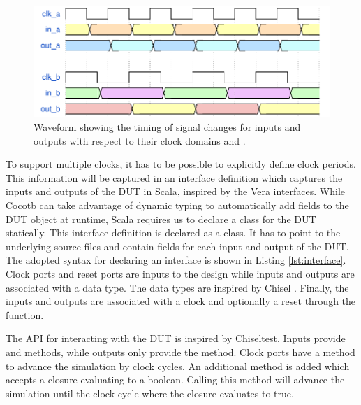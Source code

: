 \begin{figure}
\centering
\includegraphics[width=\textwidth]{diagrams/wavedrom.pdf}
\caption{Waveform showing the timing of signal changes for inputs and outputs with respect to their clock domains  and .}
\label{fig:wavedrom}
\end{figure}

To support multiple clocks, it has to be possible to explicitly define clock periods. This information will be captured in an interface definition which captures the inputs and outputs of the DUT in
Scala, inspired by the Vera interfaces. While Cocotb can take advantage of dynamic typing to automatically add fields to the DUT object at runtime,
Scala requires us to declare a class for the DUT statically. This interface definition is declared as a class.
It has to point to the underlying source files and contain fields for each input and output of the DUT. The adopted
syntax for declaring an interface is shown in Listing \ref{lst:interface}. Clock ports and reset ports are inputs to
the design while inputs and outputs are associated with a data type. The data types are inspired by Chisel
\cite{chiselpaper}. Finally, the inputs and outputs are associated with a clock and optionally a reset through the
 function.

The API for interacting with the DUT is inspired by Chiseltest. Inputs provide  and  methods,
while outputs only provide the  method. Clock ports have a  method to advance the simulation by
 clock cycles. An additional method  is added which accepts a closure evaluating to a boolean. Calling this method will advance the simulation until the clock cycle where the closure evaluates to true. 


